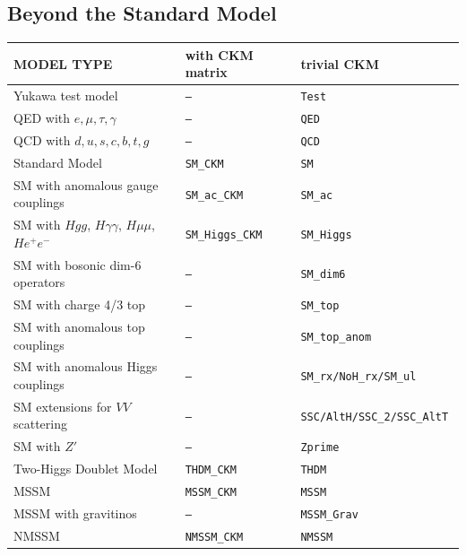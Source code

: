 \documentclass[12pt]{book}
\begin{document}

\subsection{Beyond the Standard Model}
\label{sec:bsmmodels}

\begin{table}
        \begin{center}
           \begin{tabular}{|l|l|l|}
             \hline
             MODEL TYPE & with CKM matrix & trivial CKM \\
             \hline\hline
             Yukawa test model & \tt{---} & \tt{Test} \\
             \hline
             QED with $e,\mu,\tau,\gamma$ & \tt{---} &  \tt{QED} \\
             QCD with $d,u,s,c,b,t,g$ & \tt{---} &  \tt{QCD} \\
             Standard Model        & \tt{SM\_CKM} & \tt{SM} \\
             SM with anomalous gauge couplings &  \tt{SM\_ac\_CKM} &
             \tt{SM\_ac} \\
             SM with $Hgg$, $H\gamma\gamma$, $H\mu\mu$, $He^+e^-$ &
             \tt{SM\_Higgs\_CKM} & \tt{SM\_Higgs} \\
             SM with bosonic dim-6 operators &  \tt{---} &
             \tt{SM\_dim6} \\
             SM with charge 4/3 top &  \tt{---} &
             \tt{SM\_top} \\
             SM with anomalous top couplings &  \tt{---} &
             \tt{SM\_top\_anom} \\
             SM with anomalous Higgs couplings &  \tt{---} &
             \tt{SM\_rx}/\tt{NoH\_rx}/\tt{SM\_ul} \\\hline
             SM extensions for $VV$ scattering & \tt{---} &
             \tt{SSC}/\tt{AltH}/\tt{SSC\_2}/\tt{SSC\_AltT} \\\hline
             SM with $Z'$ & \tt{---} & \tt{Zprime} \\
             \hline
             Two-Higgs Doublet Model & \tt{THDM\_CKM} & \tt{THDM} \\ \hline\hline
             MSSM &   \tt{MSSM\_CKM} & \tt{MSSM} \\
             \hline
             MSSM with gravitinos &   \tt{---} & \tt{MSSM\_Grav} \\
             \hline
             NMSSM &   \tt{NMSSM\_CKM} & \tt{NMSSM} \\

\end{tabular}
\end{center}
\end{table}
\end{document}
